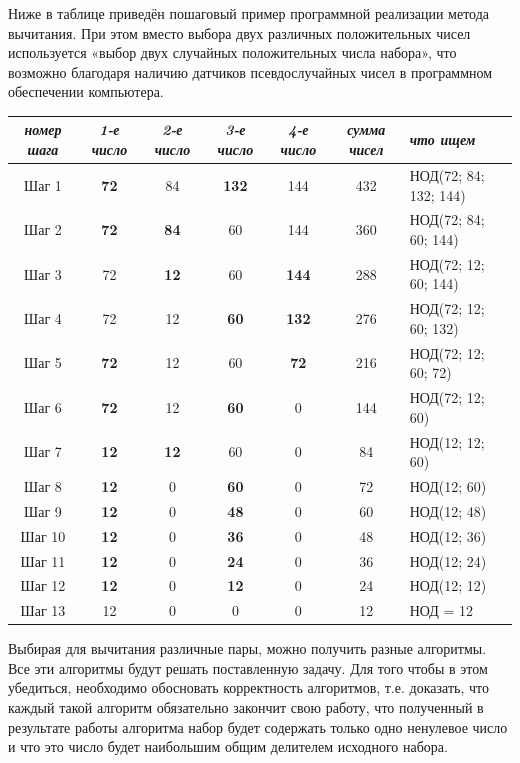 \newpage

Ниже в таблице приведён пошаговый пример программной реализации метода вычитания. При этом вместо выбора двух различных положительных чисел используется «выбор двух случайных положительных числа набора», что возможно благодаря наличию датчиков псевдослучайных чисел в программном обеспечении компьютера.

\begin{center}
    \begin{tabularx}{\textwidth}{ |c|c|c|c|c|c|X| }
\hline
    \textit{номер шага} & \textit{1-е число} & \textit{2-е число} & \textit{3-е число} & \textit{4-е число} & \textit{сумма чисел} & \textit{что ищем} \\
\hline
    Шаг 1 & \textbf{72} & 84 & \textbf{132} & 144 & 432 & НОД(72; 84; 132; 144) \\
\hline
    Шаг 2 & \textbf{72} & \textbf{84} & 60 & 144 & 360 & НОД(72; 84; 60; 144) \\
\hline
    Шаг 3 & 72 & \textbf{12} & 60 & \textbf{144} & 288 & НОД(72; 12; 60; 144) \\
\hline
    Шаг 4 & 72 & 12 & \textbf{60} & \textbf{132} & 276 & НОД(72; 12; 60; 132) \\
\hline
    Шаг 5 & \textbf{72} & 12 & 60 & \textbf{72} & 216 & НОД(72; 12; 60; 72) \\
\hline
    Шаг 6 & \textbf{72} & 12 & \textbf{60} & 0 & 144 & НОД(72; 12; 60) \\
\hline
    Шаг 7 & \textbf{12} & \textbf{12} & 60 & 0 & 84 & НОД(12; 12; 60) \\
\hline
    Шаг 8 & \textbf{12} & 0 & \textbf{60} & 0 & 72 & НОД(12; 60) \\
\hline
    Шаг 9 & \textbf{12} & 0 & \textbf{48} & 0 & 60 & НОД(12; 48) \\
\hline
    Шаг 10 & \textbf{12} & 0 & \textbf{36} & 0 & 48 & НОД(12; 36) \\
\hline
    Шаг 11 & \textbf{12} & 0 & \textbf{24} & 0 & 36 & НОД(12; 24) \\
\hline
    Шаг 12 & \textbf{12} & 0 & \textbf{12} & 0 & 24 & НОД(12; 12) \\
\hline
    Шаг 13 & 12 & 0 & 0 & 0 & 12 & НОД = 12 \\
\hline
    \end{tabularx} 
\end{center}

Выбирая для вычитания различные пары, можно получить разные алгоритмы. Все эти алгоритмы будут решать поставленную задачу. Для того чтобы в этом убедиться, необходимо обосновать корректность алгоритмов, т.е. доказать, что каждый такой алгоритм обязательно закончит свою работу, что полученный в результате работы алгоритма набор будет содержать только одно ненулевое число и что это число будет наибольшим общим делителем исходного набора.

